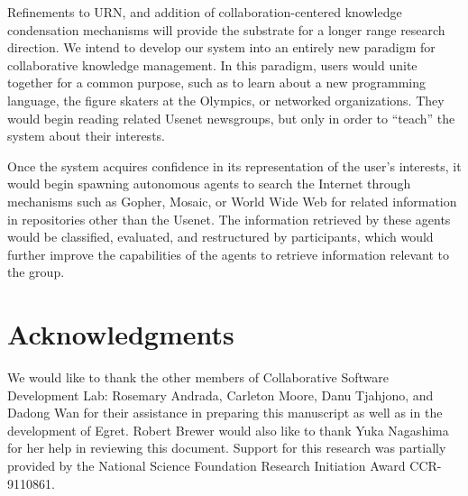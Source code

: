 Refinements to URN, and addition of collaboration-centered knowledge
condensation mechanisms will provide the substrate for a longer range
research direction.  We intend to develop our system into an entirely new
paradigm for collaborative knowledge management.  In this paradigm, users
would unite together for a common purpose, such as to learn about a new
programming language, the figure skaters at the Olympics, or networked
organizations.  They would begin reading related Usenet newsgroups, but
only in order to ``teach'' the system about their interests.

Once the system acquires confidence in its representation of the user's
interests, it would begin spawning autonomous agents to search the Internet
through mechanisms such as Gopher, Mosaic, or World Wide Web for related
information in repositories other than the Usenet. The information
retrieved by these agents would be classified, evaluated, and restructured
by participants, which would further improve the capabilities of the agents
to retrieve information relevant to the group.

\section{Acknowledgments}

We would like to thank the other members of Collaborative Software Development
Lab: Rosemary Andrada, Carleton Moore, Danu Tjahjono, and Dadong Wan for their
assistance in preparing this manuscript as well as in the development of
Egret. Robert Brewer would also like to thank Yuka Nagashima
for her help in reviewing this document.
Support for this research was partially provided by the National Science
Foundation Research Initiation Award CCR-9110861.
